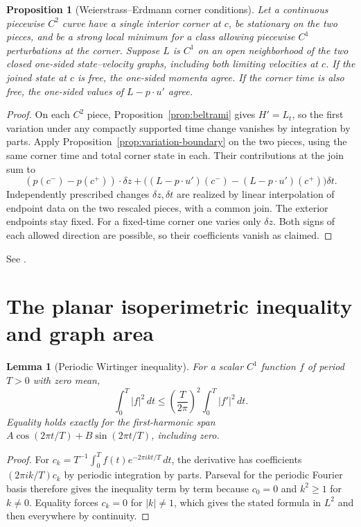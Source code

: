 \documentclass[11pt,oneside,openany]{book}
\theoremstyle{plain}
\newtheorem{lemma}[theorem]{Lemma}
\newtheorem{proposition}[theorem]{Proposition}
\theoremstyle{definition}
\theoremstyle{remark}
\begin{document}
\begin{proposition}[Weierstrass--Erdmann corner conditions]
\label{prop:v07-07-02}
Let a continuous piecewise \(C^2\) curve have a single interior
corner at \(c\), be stationary on the two pieces, and be a
strong local minimum for a class allowing piecewise \(C^1\)
perturbations at the corner. Suppose \(L\) is \(C^1\) on an open
neighborhood of the two closed one-sided state--velocity graphs,
including both limiting velocities at \(c\). If the joined state at \(c\) is
free, the one-sided momenta agree. If the corner time is also
free, the one-sided values of \(L-p\cdot u'\) agree.
\end{proposition}
\begin{proof}
On each \(C^2\) piece, Proposition~\ref{prop:beltrami} gives
\(H'=L_t\), so the first variation under any compactly
supported time change vanishes by integration by parts.
Apply Proposition~\ref{prop:variation-boundary} on the two
pieces, using the same corner time and total corner state
in each. Their contributions at the join sum to
\[
 (p(c^-)-p(c^+))\cdot\delta z+
 \bigl((L-p\cdot u')(c^-)-(L-p\cdot u')(c^+)\bigr)\delta t.
\]
Independently prescribed changes \(\delta z,\delta t\)
are realized by linear interpolation of endpoint data on the
two rescaled pieces, with a common join. The exterior endpoints
stay fixed. For a fixed-time corner one varies only \(\delta z\).
Both signs of each allowed direction are possible, so their
coefficients vanish as claimed.
\end{proof}

See \cite[Sections 3.1.1--3.1.2]{Liberzon}.

\section{The planar isoperimetric inequality and graph area}
\label{v07-08}

\begin{lemma}[Periodic Wirtinger inequality]
\label{lem:v07-08-01}
For a scalar \(C^1\) function \(f\) of period \(T>0\) with zero
mean,
\[
 \int_0^T |f|^2\,dt
   \le \left(\frac{T}{2\pi}\right)^2\int_0^T |f'|^2\,dt.
\]
Equality holds exactly for the first-harmonic span
\(A\cos(2\pi t/T)+B\sin(2\pi t/T)\), including zero.
\end{lemma}
\begin{proof}
For \(c_k=T^{-1}\int_0^T f(t)e^{-2\pi ikt/T}\,dt\),
the derivative has coefficients \((2\pi ik/T)c_k\) by
periodic integration by parts. Parseval for the periodic Fourier
basis \cite[Unit U1]{MathGenomeP102} therefore gives the
inequality term by term because
\(c_0=0\) and \(k^2\ge1\) for \(k\ne0\).
Equality forces \(c_k=0\) for \(|k|\ne1\), which gives the
stated formula in \(L^2\) and then everywhere by continuity.
\end{proof}
\end{document}
